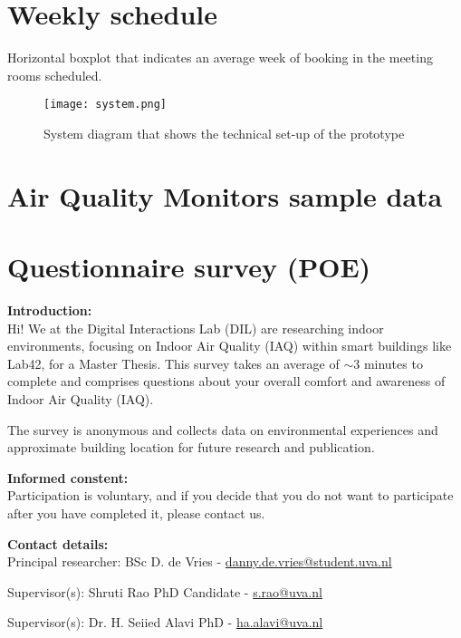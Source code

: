 \begin{appendices}
\section{Weekly schedule}
\label{appendix:schedule}

Horizontal boxplot that indicates an average week of booking in the meeting rooms scheduled.

\begin{figure}[H]
    \centering
    \texttt{[image: system.png]}
    \caption{System diagram that shows the technical set-up of the prototype}
    \label{fig:timeline}
\end{figure}

\pagebreak

\section{Air Quality Monitors sample data}
\label{appendix:monitors}

\section{Questionnaire survey (POE)}
\label{appendix:survey}

\textbf{Introduction:}\\

Hi! We at the Digital Interactions Lab (DIL) are researching indoor environments, focusing on Indoor Air Quality (IAQ) within smart buildings like Lab42, for a Master Thesis. This survey takes an average of $\sim$3 minutes to complete and comprises questions about your overall comfort and awareness of Indoor Air Quality (IAQ).

The survey is anonymous and collects data on environmental experiences and approximate building location for future research and publication.

\textbf{Informed constent:}\\
Participation is voluntary, and if you decide that you do not want to participate after you have completed it, please contact us.

\textbf{Contact details:}\\
Principal researcher: BSc D. de Vries - \href{mailto:danny.de.vries@student.uva.nl}{danny.de.vries@student.uva.nl}

Supervisor(s): Shruti Rao PhD Candidate - \href{mailto:s.rao@uva.nl}{s.rao@uva.nl}

Supervisor(s): Dr. H. Seiied Alavi PhD - \href{mailto:ha.alavi@uva.nl}{ha.alavi@uva.nl}


\end{appendices}
